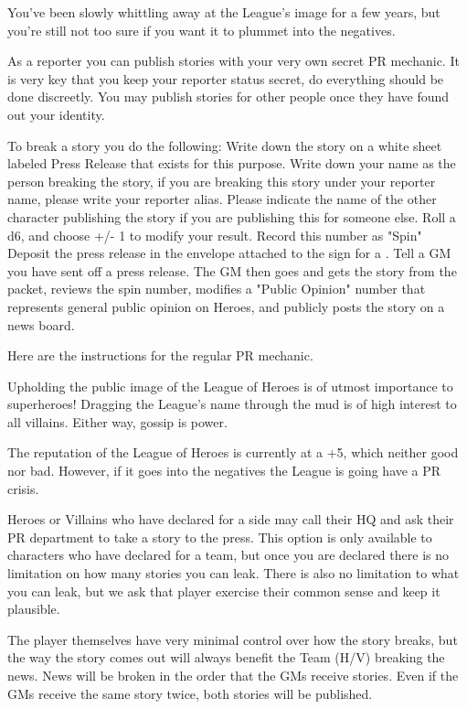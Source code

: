 \documentclass[green]{LRSguildcamp1}
\begin{document}
\name{\gNewspaperPR{}}

You've been slowly whittling away at the League's image for a few years, but you're still not too sure if you want it to plummet into the negatives. 

As a reporter you can publish stories with your very own secret PR mechanic. It is very key that you keep your reporter status secret, do everything should be done discreetly. You may publish stories for other people once they have found out your identity. 

To break a story you do the following:
Write down the story on a white sheet labeled Press Release that exists for this purpose. 
Write down your name as the person breaking the story, if you are breaking this story under your reporter name, please write your reporter alias. Please indicate the name of the other character publishing the story if you are publishing this for someone else. 
Roll a d6, and choose +/- 1 to modify your result. Record this number as "Spin"
Deposit the press release in the envelope attached to the sign for a \sWallPhone{}. 
Tell a GM you have sent off a press release.
The GM then goes and gets the story from the packet, reviews the spin number, modifies a "Public Opinion" number that represents general public opinion on Heroes, and publicly posts the story on a news board. 

Here are the instructions for the regular PR mechanic. 

Upholding the public image of the League of Heroes is of utmost importance to superheroes! 
Dragging the League's name through the mud is of high interest to all villains. Either way, gossip is power. 

The reputation of the League of Heroes is currently at a +5, which neither good nor bad. However, if it goes into the negatives the League is going have a PR crisis. 

Heroes or Villains who have declared for a side may call their HQ and ask their PR department to take a story to the press. This option is only available to characters who have declared for a team, but once you are declared there is no limitation on how many stories you can leak. There is also no limitation to what you can leak, but we ask that player exercise their common sense and keep it plausible. 

The player themselves have very minimal control over how the story breaks, but the way the story comes out will always benefit the Team (H/V) breaking the news. News will be broken in the order that the GMs receive stories. Even if the GMs receive the same story twice, both stories will be published. 
\end{document}
